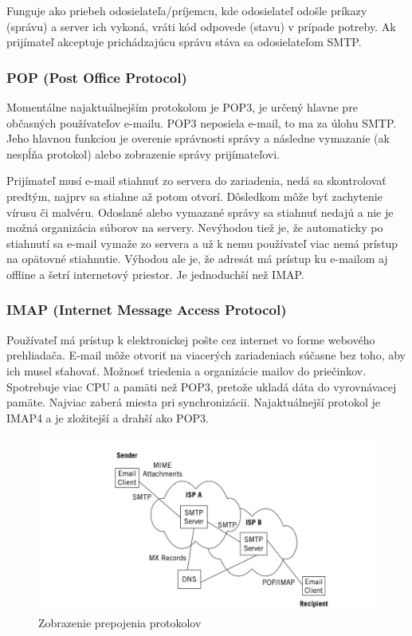 \documentclass[10pt,slovak,twoside,a4paper]{article}
\begin{document}
Funguje ako priebeh odosielateľa/príjemcu, kde odosielateľ odošle príkazy (správu) a server ich vykoná, vráti kód odpovede (stavu) v prípade potreby. Ak prijímateľ akceptuje prichádzajúcu správu stáva sa odosielateľom SMTP.\cite{GORALSKI,active,russia}

\newpage

\subsubsection{POP (Post Office Protocol)}

Momentálne najaktuálnejším protokolom je POP3, je určený hlavne pre občasných používateľov e-mailu. POP3 neposiela e-mail, to ma za úlohu SMTP. Jeho hlavnou funkciou je overenie správnosti správy a následne vymazanie (ak nespĺňa protokol) alebo zobrazenie správy prijímateľovi. 

Prijímateľ musí e-mail stiahnuť zo servera do zariadenia, nedá sa skontrolovať predtým, najprv sa stiahne až potom otvorí. Dôsledkom môže byť zachytenie vírusu či malvéru. Odoslané alebo vymazané správy sa stiahnuť nedajú a nie je možná organizácia súborov na servery. Nevýhodou tiež je, že automaticky po stiahnutí sa e-mail vymaže zo servera a už k nemu používateľ viac nemá prístup na opätovné stiahnutie. Výhodou ale je, že adresát má prístup ku e-mailom aj offline a šetrí internetový priestor. Je jednoduchší než IMAP.\cite{GORALSKI,pakistan}

\subsubsection{IMAP (Internet Message Access Protocol)}

Používateľ má prístup k elektronickej pošte cez internet vo forme webového prehliadača. E-mail môže otvoriť na viacerých zariadeniach súčasne bez toho, aby ich musel sťahovať. Možnosť triedenia a organizácie mailov do priečinkov. Spotrebuje viac CPU a pamäti než POP3, pretože ukladá dáta do vyrovnávacej pamäte. Najviac zaberá miesta pri synchronizácii.  Najaktuálnejší protokol je IMAP4 a je zložitejší a drahší ako POP3.\cite{pakistan}

\begin{figure}[tbh]
\centering
\includegraphics[scale=0.30]{mapa.jpeg}
\caption{Zobrazenie prepojenia protokolov \cite{GORALSKI}}
\end{figure}
\end{document}
